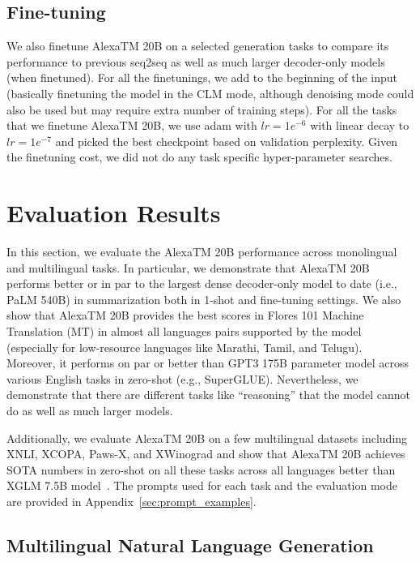 \subsection{Fine-tuning}
We also finetune {AlexaTM 20B} on a selected generation tasks to compare its performance to previous seq2seq as well as much larger decoder-only models (when finetuned). For all the finetunings, we add {\ttfamily [CLM]} to the beginning of the input (basically finetuning the model in the CLM mode, although denoising mode could also be used but may require extra number of training steps). For all the tasks that we finetune {AlexaTM 20B}, we use adam with $lr=1e^{-6}$ with linear decay to $lr=1e^{-7}$ and picked the best checkpoint based on validation perplexity. Given the finetuning cost, we did not do any task specific hyper-parameter searches.

\section{Evaluation Results}
\label{sec:results}

In this section, we evaluate the {AlexaTM 20B} performance across monolingual and multilingual tasks. In particular, we demonstrate that {AlexaTM 20B} performs better or in par to the largest dense decoder-only model to date (i.e., PaLM 540B) in summarization both in 1-shot and fine-tuning settings. We also show that {AlexaTM 20B} provides the best scores in Flores 101 Machine Translation (MT) in almost all languages pairs supported by the model (especially for low-resource languages like Marathi, Tamil, and Telugu). Moreover, it performs on par or better than GPT3 175B parameter model across various English tasks in zero-shot (e.g., SuperGLUE). Nevertheless, we demonstrate  that there are different tasks like ``reasoning'' that the model cannot do as well as much larger models.

Additionally, we evaluate {AlexaTM 20B} on a few multilingual datasets including XNLI, XCOPA, Paws-X, and XWinograd and show that {AlexaTM 20B} achieves SOTA numbers in zero-shot on all these tasks across all languages better than XGLM 7.5B model~\citep{Lin2021FewshotLW}. The prompts used for each task and the evaluation mode are provided in Appendix~\ref{sec:prompt_examples}.

\subsection{Multilingual Natural Language Generation}
\label{sec:nlg}

